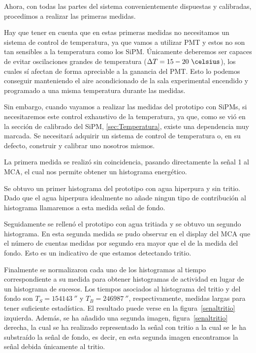 Ahora, con todas las partes del sistema convenientemente dispuestas y calibradas, procedimos a realizar las primeras medidas.

Hay que tener en cuenta que en estas primeras medidas no necesitamos un sistema de control de temperatura, ya que vamos a utilizar PMT y estos no son tan sensibles a la temperatura como los SiPM. Únicamente deberemos ser capaces de evitar oscilaciones grandes de temperatura ($\Delta T=15-20~\celsius$), los cuales sí afectan de forma apreciable a la ganancia del PMT. Esto lo podemos conseguir manteniendo el aire acondicionado de la sala experimental encendido y programado a una misma temperatura durante las medidas. 

Sin embargo, cuando vayamos a realizar las medidas del prototipo con SiPMs, si necesitaremos este control exhaustivo de la temperatura, ya que, como se vió en la sección de calibrado del SiPM, \ref{sec:Temperatura}, existe una dependencia muy marcada. Se necesitará adquirir un sistema de control de temperatura o, en su defecto, construir y calibrar uno nosotros mismos.

La primera medida se realizó sin coincidencia, pasando directamente la señal 1 al MCA, el cual nos permite obtener un histograma energético.

Se obtuvo un primer histograma del prototipo con agua hiperpura y sin tritio. Dado que el agua hiperpura idealmente no añade ningun tipo de contribución al histograma llamaremos a esta medida señal de fondo. 

Seguidamente se rellenó el prototipo con agua tritiada y se obtuvo un segundo histograma. En esta segunda medida se pudo observar en el display del MCA que el número de cuentas medidas por segundo era mayor que el de la medida del fondo. Esto es un indicativo de que estamos detectando tritio. 

Finalmente se normalizaron cada uno de los histogramas al tiempo correspondiente a su medida para obtener histogramas de actividad en lugar de un histograma de sucesos. Los tiempos asociados al histograma del tritio y del fondo son $T_S=154143~\second$  y $T_B=246987~\second$, respectivamente, medidas largas para tener suficiente estadística. El resultado puede verse en la figura~\ref{senaltritio} izquierda. Además, se ha añadido una segunda imagen, figura~\ref{senaltritio} derecha,  la cual se ha realizado representado la señal con tritio a la cual se le ha substraído la señal de fondo, es decir, en esta segunda imagen encontramos la señal debida únicamente al tritio.

